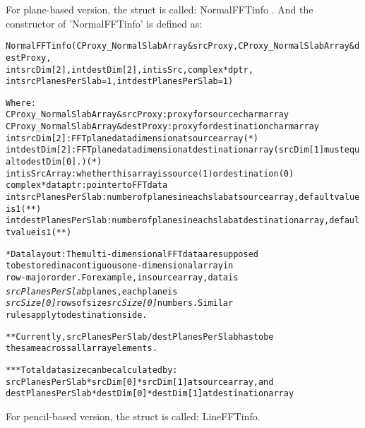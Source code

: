 For plane-based version, the struct is called: NormalFFTinfo . And the
constructor of 'NormalFFTinfo' is defined as:

\begin{alltt}
        NormalFFTinfo(CProxy_NormalSlabArray &srcProxy, CProxy_NormalSlabArray &destProxy,
                      int srcDim[2], int destDim[2], int isSrc, complex *dptr, 
                      int srcPlanesPerSlab=1, int destPlanesPerSlab=1)

        Where: 
        CProxy_NormalSlabArray &srcProxy : proxy for source charm array 
        CProxy_NormalSlabArray &destProxy : proxy for destination charm array 
        int srcDim[2] : FFT plane data dimension at source array (*)
        int destDim[2] : FFT plane data dimension at destination array ( srcDim[1] must equal to destDim[0].) (*) 
        int isSrcArray : whether this array is source (1) or destination (0)
        complex *dataptr : pointer to FFT data 
        int srcPlanesPerSlab : number of planes in each slab at source array, default value is 1 (**) 
        int destPlanesPerSlab : number of planes in each slab at destination array, default value is 1 (**)

          * Data layout : The multi-dimensional FFT data are supposed
            to be stored in a contiguous one-dimensional array in
            row-major order. For example, in source array, data is
            {\it srcPlanesPerSlab} planes, each plane is {\it
            srcSize[0]} rows of size {\it srcSize[0]} numbers. Similar
            rules apply to destination side.


          ** Currently, srcPlanesPerSlab/destPlanesPerSlab has to be
             the same across all array elements.

          *** Total data size can be calculated by:
              srcPlanesPerSlab*srcDim[0]*srcDim[1] at source array, and
              destPlanesPerSlab*destDim[0]*destDim[1] at destination array
 
\end{alltt}



For pencil-based version, the struct is called: LineFFTinfo.

